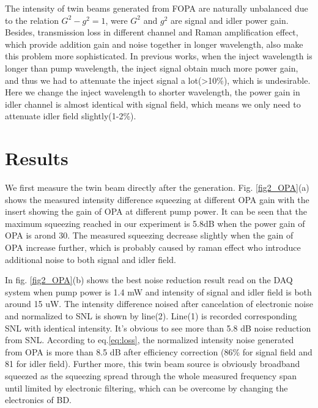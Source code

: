 \documentclass[9pt,twocolumn,twoside]{osajnl}
\begin{document}
The intensity of twin beams generated from FOPA are naturally unbalanced due to the relation $G^2-g^2=1$, were $G^2$ and $g^2$ are signal and idler power gain. 
Besides, transmission loss in different channel and Raman amplification effect, which provide addition gain and noise together in longer wavelength, also make this problem more sophisticated.
In previous works\cite{guo12}, when the inject wavelength is longer than pump wavelength, the inject signal obtain much more power gain, and thus we had to attenuate the inject signal a lot(>10\%), which is undesirable. 
Here we change the inject wavelength to shorter wavelength, the power gain in idler channel is almost identical with signal field, which means we only need to attenuate idler field slightly(1-2\%).



\section{Results}

We first measure the twin beam directly after the generation.
Fig. \ref{fig2_OPA}(a) shows the measured intensity difference squeezing at different OPA gain with the insert showing the gain of OPA at different pump power.
It can be seen that the maximum squeezing reached in our experiment is 5.8dB when the power gain of OPA is arond 30.
The measured squeezing decrease slightly when the gain of OPA increase further, which is probably caused by raman effect who introduce additional noise to both signal and idler field.

In fig. \ref{fig2_OPA}(b) shows the best noise reduction result read on the DAQ system when pump power is 1.4 mW and intensity of signal and idler field is both around 15 uW. The intensity difference noised after cancelation of electronic noise and normalized to SNL is shown by line(2). Line(1) is recorded corresponding SNL with identical intensity. It's obvious to see more than 5.8 dB noise reduction from SNL.
According to eq.\ref{eq:loss}, the normalized intensity noise generated from OPA is more than 8.5 dB after efficiency correction%
(86\% for signal field and 81 for idler field).	
Further more, this twin beam source is obviously broadband squeezed as the squeezing spread through the whole measured frequency span until limited by electronic filtering, which can be overcome by changing the electronics of BD.
\end{document}

